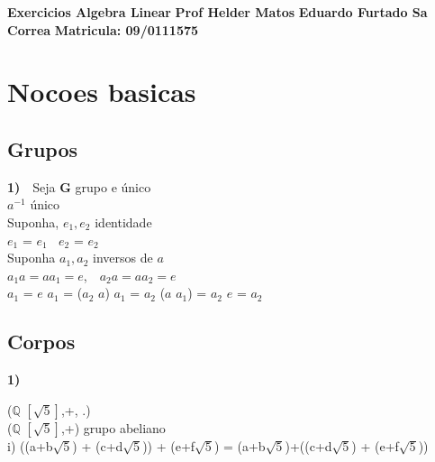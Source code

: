 \documentclass[a4paper,12pt]{report}
\begin{document}
\begin{center}

\textbf{\huge Exercicios Algebra Linear } 
\linebreak 
\textbf{\large Prof Helder Matos } 
\linebreak 
\linebreak 
\linebreak 
\linebreak 
\textbf{\large Eduardo Furtado Sa Correa } 
\linebreak 
\textbf{Matricula: 09/0111575 }
\linebreak 
\end{center}

 


\chapter{Nocoes basicas }
\section{Grupos}
\textbf{1)}
 $~~~$Seja \textbf{G} grupo 
	    e \'unico \\

{$a^{-1}$  \'unico }\\

{Suponha, $e_{1},e_{2}$  identidade }\\
     
{$e_{1}$  =   $e_{1}~~~~ e_{2}$  = $e_{2}$} \\

{Suponha $a_{1}, a_{2}$   inversos  de $a$ }\\

$a_{1} a = a a_{1} = e$,$~~~$ $a_{2} a = a a_{2} = e$ \\

$a_{1}$ = $e$ $a_{1}$ = ($a_{2}$ $a$) $a_{1}$ = $a_{2}$ ($a$ $a_{1}$) = $a_{2}$ $e$ = $a_{2}$ \\
\section{Corpos}
\textbf{1)}

($\mathbb{Q}$ $[\sqrt{5}]$,+, .)\\

($\mathbb{Q}$ $[\sqrt{5}]$,+)  grupo  abeliano\\

i) ((a+b$\sqrt{5}$) + (c+d$\sqrt{5}$)) +  (e+f$\sqrt{5}$) = (a+b$\sqrt{5}$)+((c+d$\sqrt{5}$) + (e+f$\sqrt{5}$)) \\
\end{document}
